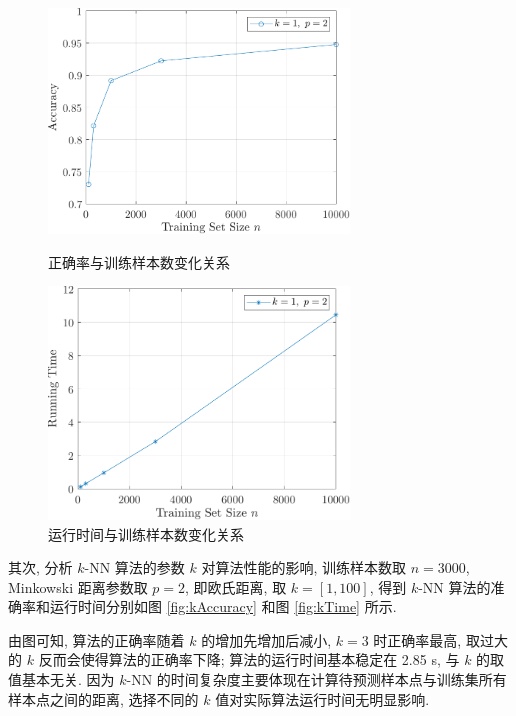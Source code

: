 \documentclass{article}
\begin{document}
\begin{figure}[htbp]
  \centering
  \begin{minipage}[t]{0.48\textwidth}
    \centering
    \includegraphics[width=8cm]{sampleAccuracy.pdf}
    \caption{正确率与训练样本数变化关系}
    \label{fig:sampleAccuracy}
  \end{minipage}
  \begin{minipage}[t]{0.48\textwidth}
    \centering
    \includegraphics[width=8cm]{sampleTime.pdf}
    \caption{运行时间与训练样本数变化关系}
    \label{fig:sampleTime}
  \end{minipage}
\end{figure}

其次, 分析 $k$-NN 算法的参数 $k$ 对算法性能的影响, 训练样本数取 $n=3000$, Minkowski 距离参数取 $p=2$, 即欧氏距离, 取 $k=[1,100]$, 得到 $k$-NN 算法的准确率和运行时间分别如图 \ref{fig:kAccuracy} 和图 \ref{fig:kTime} 所示.

由图可知, 算法的正确率随着 $k$ 的增加先增加后减小, $k=3$ 时正确率最高, 取过大的 $k$ 反而会使得算法的正确率下降; 算法的运行时间基本稳定在 2.85 s, 与 $k$ 的取值基本无关. 因为 $k$-NN 的时间复杂度主要体现在计算待预测样本点与训练集所有样本点之间的距离, 选择不同的 $k$ 值对实际算法运行时间无明显影响.
\end{document}
